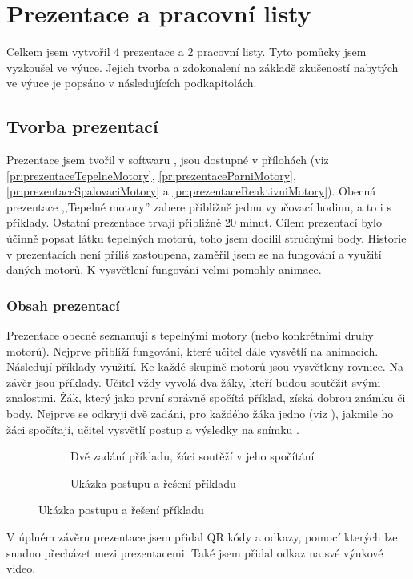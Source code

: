 \section{Prezentace a pracovní listy}\label{sc:prezentace}
{Celkem jsem vytvořil 4 prezentace a 2 pracovní listy. Tyto pomůcky jsem vyzkoušel ve výuce. Jejich tvorba a zdokonalení na základě zkušeností nabytých ve výuce je popsáno v následujících podkapitolách.}
\subsection{Tvorba prezentací}
{Prezentace jsem tvořil v softwaru , jsou dostupné v přílohách (viz \ref{pr:prezentaceTepelneMotory}, \ref{pr:prezentaceParniMotory}, \ref{pr:prezentaceSpalovaciMotory} a \ref{pr:prezentaceReaktivniMotory}). Obecná prezentace ,,Tepelné motory'' zabere přibližně jednu vyučovací hodinu, a to i s příklady. Ostatní prezentace trvají přibližně 20 minut.}\odst
{Cílem prezentací bylo účinně popsat látku tepelných motorů, toho jsem docílil stručnými body. Historie v prezentacích není příliš zastoupena, zaměřil jsem se na fungování a využití daných motorů. K vysvětlení fungování velmi pomohly animace.}
\subsubsection{Obsah prezentací}
{Prezentace obecně seznamují s tepelnými motory (nebo konkrétními druhy motorů). Nejprve přiblíží fungování, které učitel dále vysvětlí na animacích. Následují příklady využití. Ke každé skupině motorů jsou vysvětleny rovnice.}\odst
{Na závěr jsou příklady. Učitel vždy vyvolá dva žáky, kteří budou soutěžit svými znalostmi. Žák, který jako první správně spočítá příklad, získá dobrou známku či body. Nejprve se odkryjí dvě zadání, pro každého žáka jedno (viz ), jakmile ho žáci spočítají, učitel vysvětlí postup a výsledky na snímku .}
\begin{figure}[H]
    \begingroup
    \makeatletter
    \renewcommand\thesubfigure{\thefigure~--~\@nameuse{subfiglabel@\alph{subfigure}}}
    \newcommand{\subfiglabel@a}{vlevo}
    \newcommand{\subfiglabel@b}{vpravo}
    \captionsetup[subfigure]{labelformat=simple, labelsep=colon}
    \renewcommand\p@subfigure{}
    \makeatother
    \begin{subfigure}{0.45\textwidth}
        \centering
        \setlength{\fboxsep}{0pt}
        \caption{Dvě zadání příkladu, žáci soutěží v jeho spočítání \jaObr}
        \label{obr:prikladyZadani}
    \end{subfigure}\hfill
    \begin{subfigure}{0.45\textwidth}
        \centering
        \setlength{\fboxsep}{0pt}
        \caption{Ukázka postupu a řešení příkladu \jaObr}
        \label{obr:prikladyReseni}
    \end{subfigure}
    \endgroup
\end{figure}
{V úplném závěru prezentace jsem přidal QR kódy a odkazy, pomocí kterých lze snadno přecházet mezi prezentacemi. Také jsem přidal odkaz na své výukové video.}
\newpage

